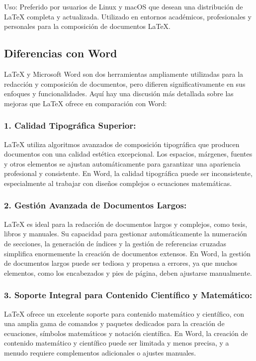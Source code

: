 \documentclass{article}
\begin{document}
Uso:
Preferido por usuarios de Linux y macOS que desean una distribución de LaTeX completa y actualizada.
Utilizado en entornos académicos, profesionales y personales para la composición de documentos LaTeX.

\subsection{Diferencias con Word}
LaTeX y Microsoft Word son dos herramientas ampliamente utilizadas para la redacción y composición de documentos, pero difieren significativamente en sus enfoques y funcionalidades. Aquí hay una discusión más detallada sobre las mejoras que LaTeX ofrece en comparación con Word:


\subsubsection{1. Calidad Tipográfica Superior:}
LaTeX utiliza algoritmos avanzados de composición tipográfica que producen documentos con una calidad estética excepcional. Los espacios, márgenes, fuentes y otros elementos se ajustan automáticamente para garantizar una apariencia profesional y consistente.
En Word, la calidad tipográfica puede ser inconsistente, especialmente al trabajar con diseños complejos o ecuaciones matemáticas.


\subsubsection{2. Gestión Avanzada de Documentos Largos:}
LaTeX es ideal para la redacción de documentos largos y complejos, como tesis, libros y manuales. Su capacidad para gestionar automáticamente la numeración de secciones, la generación de índices y la gestión de referencias cruzadas simplifica enormemente la creación de documentos extensos.
En Word, la gestión de documentos largos puede ser tediosa y propensa a errores, ya que muchos elementos, como los encabezados y pies de página, deben ajustarse manualmente.


\subsubsection{3. Soporte Integral para Contenido Científico y Matemático:}
LaTeX ofrece un excelente soporte para contenido matemático y científico, con una amplia gama de comandos y paquetes dedicados para la creación de ecuaciones, símbolos matemáticos y notación científica.
En Word, la creación de contenido matemático y científico puede ser limitada y menos precisa, y a menudo requiere complementos adicionales o ajustes manuales.
\end{document}
